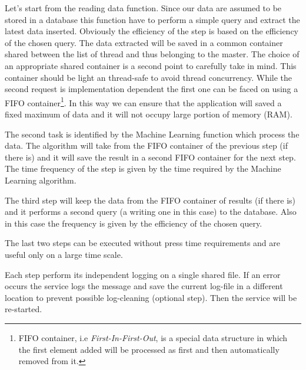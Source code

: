 \documentclass{standalone}
\begin{document}
Let's start from the reading data function.
Since our data are assumed to be stored in a database this function have to perform a simple query and extract the latest data inserted.
Obviously the efficiency of the step is based on the efficiency of the chosen query.
The data extracted will be saved in a common container shared between the list of thread and thus belonging to the master.
The choice of an appropriate shared container is a second point to carefully take in mind.
This container should be light an thread-safe to avoid thread concurrency.
While the second request is implementation dependent the first one can be faced on using a FIFO container\footnote{
  FIFO container, i.e \emph{First-In-First-Out}, is a special data structure in which the first element added will be processed as first and then automatically removed from it.
}.
In this way we can ensure that the application will saved a fixed maximum of data and it will not occupy large portion of memory (RAM).

The second task is identified by the Machine Learning function which process the data.
The algorithm will take from the FIFO container of the previous step (if there is) and it will save the result in a second FIFO container for the next step.
The time frequency of the step is given by the time required by the Machine Learning algorithm.

The third step will keep the data from the FIFO container of results (if there is) and it performs a second query (a writing one in this case) to the database.
Also in this case the frequency is given by the efficiency of the chosen query.

The last two steps can be executed without press time requirements and are useful only on a large time scale.

Each step perform its independent logging on a single shared file.
If an error occurs the service logs the message and save the current log-file in a different location to prevent possible log-cleaning (optional step).
Then the service will be re-started.

% 

\end{document}
